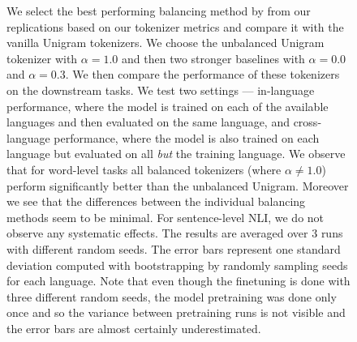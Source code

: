 \begin{figure}
\begin{subfigure}{.5\textwidth}
    \end{subfigure}
    \caption{We select the best performing balancing method by \citet{chung_improving_2020} from our replications based on our tokenizer metrics and compare it with the vanilla Unigram tokenizers. We choose the unbalanced Unigram tokenizer with $\alpha=1.0$ and then two stronger baselines with $\alpha=0.0$ and $\alpha=0.3$. We then compare the performance of these tokenizers on the downstream tasks. We test two settings --- in-language performance, where the model is trained on each of the available languages and then evaluated on the same language, and cross-language performance, where the model is also trained on each language but evaluated on all \textit{but} the training language. We observe that for word-level tasks all balanced tokenizers (where $\alpha\neq1.0$) perform significantly better than the unbalanced Unigram. Moreover we see that the differences between the individual balancing methods seem to be minimal. For sentence-level NLI, we do not observe any systematic effects.
    The results are averaged over 3 runs with different random seeds. The error bars represent one standard deviation computed with bootstrapping by randomly sampling seeds for each language. Note that even though the finetuning is done with three different random seeds, the model pretraining was done only once and so the variance between pretraining runs is not visible and the error bars are almost certainly underestimated.}
    \label{fig:probe_overall}
\end{figure}



